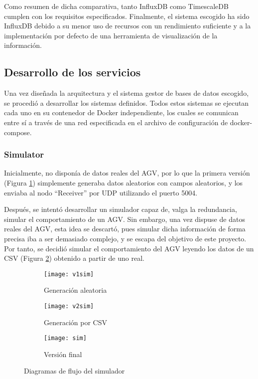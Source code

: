 Como resumen de dicha comparativa, tanto InfluxDB como TimescaleDB cumplen con los requisitos especificados. Finalmente,
el sistema escogido ha sido InfluxDB debido a su menor uso de recursos con un rendimiento suficiente y a 
la implementación por defecto de una herramienta de visualización de la información.

\subsection{Desarrollo de los servicios}

Una vez diseñada la arquitectura y el sistema gestor de bases de datos escogido, se procedió a desarrollar los
sistemas definidos. Todos estos sistemas se ejecutan cada uno en su contenedor de Docker independiente, los cuales 
se comunican entre sí a través de una red especificada en el archivo de configuración de docker-compose.

\subsubsection{Simulator}
Inicialmente, no disponía de datos reales del AGV, por lo que la primera versión (Figura \ref{fig:v1sim}) simplemente generaba datos aleatorios
con campos aleatorios, y los enviaba al nodo ``Receiver'' por UDP utilizando el puerto 5004.

Después, se intentó desarrollar un simulador capaz de, valga la redundancia, simular el comportamiento de un AGV. Sin
embargo, una vez dispuse de datos reales del AGV, esta idea se descartó, pues simular dicha información de forma
precisa iba a ser demasiado complejo, y se escapa del objetivo de este proyecto. Por tanto, se decidió simular el
comportamiento del AGV leyendo los datos de un CSV (Figura \ref{fig:v2sim}) obtenido a partir de uno real.

\begin{figure}
    \centering
    \begin{subfigure}[b]{0.45\textwidth}
        \centering
        \texttt{[image: v1sim]}
        \caption{Generación aleatoria}
        \label{fig:v1sim}
    \end{subfigure}
    \hfill
    \begin{subfigure}[b]{0.45\textwidth}
        \centering
        \texttt{[image: v2sim]}
        \caption{Generación por CSV}
        \label{fig:v2sim}
    \end{subfigure}
    \begin{subfigure}[b]{0.7\textwidth}
        \centering
        \texttt{[image: sim]}
        \caption{Versión final}
        \label{fig:sim}
    \end{subfigure}
    \caption{Diagramas de flujo del simulador}
    \label{fig:diagsim}
\end{figure}


